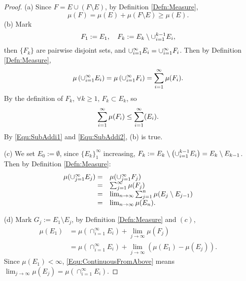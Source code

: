 \begin{proof}
    (a) Since $F=E\cup (F\setminus E)$, 
    by Definition \ref{Defn:Measure}, 
    \begin{displaymath}
        \mu(F)=\mu(E)+\mu(F\setminus E)\ge\mu(E).
    \end{displaymath}
    (b) Mark 
    \begin{displaymath}
        F_{1}:=E_{1},\quad F_{k}:=E_{k}\setminus\cup_{i=1}^{k-1}E_{i},
    \end{displaymath}
    then $\{F_{k}\}$ are pairwise disjoint sets, and 
    $\cup_{i=1}^{\infty}E_{i}=\cup_{i=1}^{\infty}F_{i}$.  
    Then by Definition \ref{Defn:Measure}, 
    \begin{equation}
        \label{Equ:SubAddi1}
        \mu\left(\cup_{i=1}^{\infty}E_i\right)
        =\mu\left(\cup_{i=1}^{\infty}F_{i}\right)=\sum_{i=1}^{\infty}\mu(F_i).
    \end{equation}
    By the definition of $F_{k}$, 
    $\forall k\ge 1$, $F_{k}\subset E_{k}$, so 
    \begin{equation}
        \label{Equ:SubAddi2}
        \sum_{i=1}^{\infty}\mu(F_i)\le\sum_{i=1}^{\infty}(E_i).
    \end{equation}
    By \eqref{Equ:SubAddi1} and \eqref{Equ:SubAddi2}, 
    (b) is true. 

    (c) We set $E_0:=\emptyset$, since $\{E_{k}\}_{1}^{\infty}$ 
    increasing, $F_{k}:=E_{k}\setminus\left(\cup_{i=1}^{k-1}E_i\right)
    =E_{k}\setminus E_{k-1}$. 
    Then by Definition \ref{Defn:Measure}:
    \begin{displaymath}
        \begin{array}{rl}
        \mu(\cup_{j=1}^{\infty}E_j)=&\mu(\cup_{j=1}^{\infty}F_j)\\
        =&\sum_{j=1}^{\infty}\mu(F_j)\\
        =&\lim_{n\rightarrow\infty}\sum_{j=1}^{n}\mu(E_j\setminus E_{j-1})\\
        =&\lim_{n\rightarrow\infty}\mu(E_n).\\
        \end{array}
    \end{displaymath}

    (d) Mark $G_{j}:=E_{1}\setminus E_{j}$, 
    by Definition \ref{Defn:Measure} and $(c)$, 
    \begin{equation}
        \label{Equ:ContinuousFromAbove}
        \begin{array}{rl}
            \mu(E_1)&=\mu(\cap_{i=1}^{\infty}E_{i})
            +\lim_{j\rightarrow\infty}\mu(F_j)\\
            &=\mu(\cap_{i=1}^{\infty}E_{i})+\lim_{j\rightarrow\infty}
            (\mu(E_1)-\mu(E_{j})).
        \end{array}
    \end{equation} 
    Since $\mu(E_1)<\infty$, \eqref{Equ:ContinuousFromAbove} 
    means $\lim_{j\rightarrow\infty}\mu(E_{j})
    =\mu(\cap_{i=1}^{\infty}E_{i})$. 
\end{proof}
